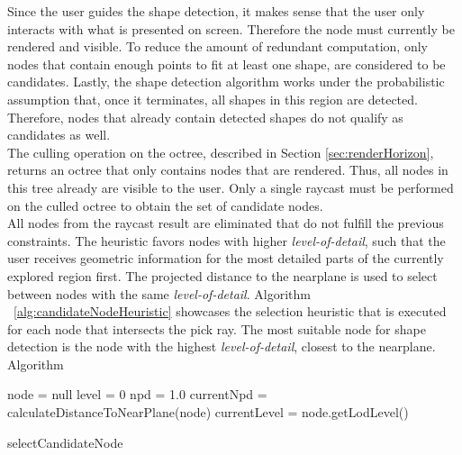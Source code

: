 Since the user guides the shape detection, it makes sense that the user only interacts with what is presented on screen. Therefore the node must currently be rendered and visible. To reduce the amount of redundant computation, only nodes that contain enough points to fit at least one shape, are considered to be candidates. Lastly, the shape detection algorithm works under the probabilistic assumption that, once it terminates, all shapes in this region are detected. Therefore, nodes that already contain detected shapes do not qualify as candidates as well. 
\\
The culling operation on the octree, described in Section \ref{sec:renderHorizon}, returns an octree that only contains nodes that are rendered. Thus, all nodes in this tree already are visible to the user. Only a single raycast must be performed on the culled octree to obtain the set of candidate nodes. 
\\
All nodes from the raycast result are eliminated that do not fulfill the previous constraints. The heuristic favors nodes with higher \textit{level-of-detail}, such that the user receives geometric information for the most detailed parts of the currently explored region first. The projected distance to the nearplane is used to select between nodes with the same \textit{level-of-detail}. Algorithm ~\ref{alg:candidateNodeHeuristic} showcases the selection heuristic that is executed for each node that intersects the pick ray. The most suitable node for shape detection is the node with the highest \textit{level-of-detail}, closest to the nearplane. Algorithm 

\begin{algorithm}
    
    node     = null\;
    level = 0\;
    npd     = 1.0\;
    {            
        currentNpd = calculateDistanceToNearPlane(node)    \;
        currentLevel = node.getLodLevel()\;
    }
\caption[A heuristic that chooses the most suitable candidate node]{selectCandidateNode}
\label{alg:candidateNodeHeuristic}
\end{algorithm}

